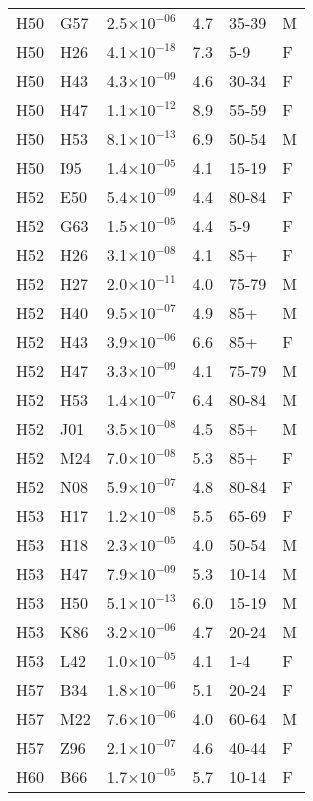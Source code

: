 \begin{longtable}{lllrll}
   H50 & G57 & 2.5$\times10^{-06}$ & 4.7 & 35-39 & M \\ 
   H50 & H26 & 4.1$\times10^{-18}$ & 7.3 & 5-9 & F \\ 
   H50 & H43 & 4.3$\times10^{-09}$ & 4.6 & 30-34 & F \\ 
   H50 & H47 & 1.1$\times10^{-12}$ & 8.9 & 55-59 & F \\ 
   H50 & H53 & 8.1$\times10^{-13}$ & 6.9 & 50-54 & M \\ 
   H50 & I95 & 1.4$\times10^{-05}$ & 4.1 & 15-19 & F \\ 
   H52 & E50 & 5.4$\times10^{-09}$ & 4.4 & 80-84 & F \\ 
   H52 & G63 & 1.5$\times10^{-05}$ & 4.4 & 5-9 & F \\ 
   H52 & H26 & 3.1$\times10^{-08}$ & 4.1 & 85+ & F \\ 
   H52 & H27 & 2.0$\times10^{-11}$ & 4.0 & 75-79 & M \\ 
   H52 & H40 & 9.5$\times10^{-07}$ & 4.9 & 85+ & M \\ 
   H52 & H43 & 3.9$\times10^{-06}$ & 6.6 & 85+ & F \\ 
   H52 & H47 & 3.3$\times10^{-09}$ & 4.1 & 75-79 & M \\ 
   H52 & H53 & 1.4$\times10^{-07}$ & 6.4 & 80-84 & M \\ 
   H52 & J01 & 3.5$\times10^{-08}$ & 4.5 & 85+ & M \\ 
   H52 & M24 & 7.0$\times10^{-08}$ & 5.3 & 85+ & F \\ 
   H52 & N08 & 5.9$\times10^{-07}$ & 4.8 & 80-84 & F \\ 
   H53 & H17 & 1.2$\times10^{-08}$ & 5.5 & 65-69 & F \\ 
   H53 & H18 & 2.3$\times10^{-05}$ & 4.0 & 50-54 & M \\ 
   H53 & H47 & 7.9$\times10^{-09}$ & 5.3 & 10-14 & M \\ 
   H53 & H50 & 5.1$\times10^{-13}$ & 6.0 & 15-19 & M \\ 
   H53 & K86 & 3.2$\times10^{-06}$ & 4.7 & 20-24 & M \\ 
   H53 & L42 & 1.0$\times10^{-05}$ & 4.1 & 1-4 & F \\ 
   H57 & B34 & 1.8$\times10^{-06}$ & 5.1 & 20-24 & F \\ 
   H57 & M22 & 7.6$\times10^{-06}$ & 4.0 & 60-64 & M \\ 
   H57 & Z96 & 2.1$\times10^{-07}$ & 4.6 & 40-44 & F \\ 
   H60 & B66 & 1.7$\times10^{-05}$ & 5.7 & 10-14 & F \\ 

\end{longtable}
